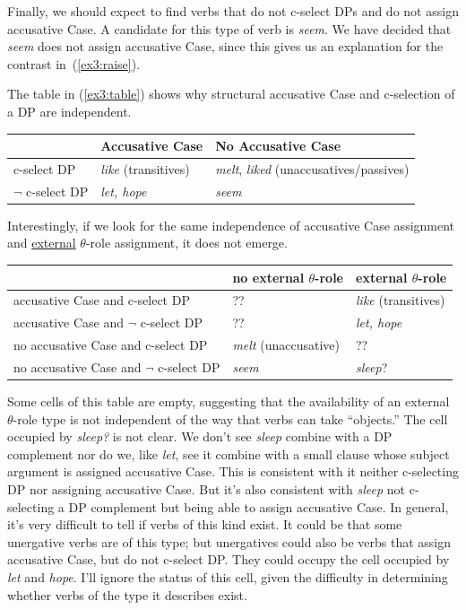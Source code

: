 Finally, we should expect to find verbs that do not c-select DPs and do not assign accusative Case. A candidate for this type of verb is \emph{seem}. We have decided that \emph{seem} does not assign accusative Case, since this gives us an explanation for the contrast in~(\ref{ex3:raise}).
\begin{exe}
	\raggedright
	\ex \label{ex3:raise} 
	\begin{xlist}
	\end{xlist}
\end{exe}
The table in (\ref{ex3:table}) shows why structural accusative Case and c-selection of a DP are independent.
\begin{exe}
	\ex \label{ex3:table}
	\begin{tabular}{l|ll}  
 & Accusative Case & No Accusative Case \\ \hline
c-select DP  & \emph{like} (transitives) &  \emph{melt}, \emph{liked} (unaccusatives/passives) \\ %
 $\neg$ c-select DP  & \emph{let, hope} & \emph{seem}\\ %
\end{tabular}
\end{exe}

Interestingly, if we look for the same independence of accusative Case assignment and \underline{external} $\theta$-role assignment, it does not emerge. 
\begin{exe}
	\ex \label{ex3:tablen}
	\begin{tabular}{l|ll}  
\   & no external $\theta$-role & external $\theta$-role \\ \hline
accusative Case and c-select DP & ?? & \emph{like} (transitives) \\ %
accusative Case and $\neg$ c-select DP  & ?? & \emph{let, hope}\\ %
no accusative Case and c-select DP & \emph{melt} (unaccusative) & ??\\ %
no accusative Case and $\neg$ c-select DP & \emph{seem} & \emph{sleep}?\\ 
\end{tabular}
\end{exe}
Some cells of this table are empty, suggesting that the availability of an external $\theta$-role type is not independent of the way that verbs can take ``objects.'' The cell occupied by \emph{sleep?} is not clear. We don't see \textit{sleep} combine with a DP complement nor do we, like \textit{let}, see it combine with a small clause whose subject argument is assigned accusative Case. This is consistent with it neither c-selecting DP nor assigning accusative Case. But it's also consistent with \textit{sleep} not c-selecting a DP complement but being able to assign accusative Case. In general, it's very difficult to tell if verbs of this kind exist. It could be that some unergative verbs are of this type; but unergatives could also be verbs that assign accusative Case, but do not c-select DP. They could occupy the cell occupied by \textit{let} and \emph{hope}. I'll ignore the status of this cell, given the difficulty in determining whether verbs of the type it describes exist.


